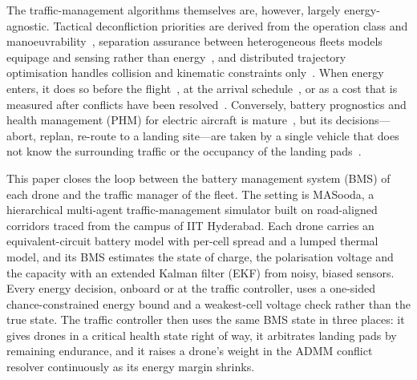 \documentclass[journal]{IEEEtran}
\begin{document}
The traffic-management algorithms themselves are, however, largely energy-agnostic. Tactical deconfliction priorities are derived from the operation class and manoeuvrability~\cite{jover2022priority}, separation assurance between heterogeneous fleets models equipage and sensing rather than energy~\cite{sharifi2026separation}, and distributed trajectory optimisation handles collision and kinematic constraints only~\cite{ni2022admm}. When energy enters, it does so before the flight~\cite{liu2017energy}, at the arrival schedule~\cite{kleinbekman2018evtol}, or as a cost that is measured after conflicts have been resolved~\cite{zongo2026overhead}. Conversely, battery prognostics and health management (PHM) for electric aircraft is mature~\cite{saha2011bhm,bole2014online,kulkarni2018remaining,hogge2024octocopter,kulkarni2024thermal}, but its decisions---abort, replan, re-route to a landing site---are taken by a single vehicle that does not know the surrounding traffic or the occupancy of the landing pads~\cite{taye2025safe,quinones2020decision,montazeri2024health,baculi2019onboard}.

This paper closes the loop between the battery management system (BMS) of each drone and the traffic manager of the fleet. The setting is MASooda, a hierarchical multi-agent traffic-management simulator built on road-aligned corridors traced from the campus of IIT Hyderabad. Each drone carries an equivalent-circuit battery model with per-cell spread and a lumped thermal model, and its BMS estimates the state of charge, the polarisation voltage and the capacity with an extended Kalman filter (EKF) from noisy, biased sensors. Every energy decision, onboard or at the traffic controller, uses a one-sided chance-constrained energy bound and a weakest-cell voltage check rather than the true state. The traffic controller then uses the same BMS state in three places: it gives drones in a critical health state right of way, it arbitrates landing pads by remaining endurance, and it raises a drone's weight in the ADMM conflict resolver continuously as its energy margin shrinks.
\end{document}
